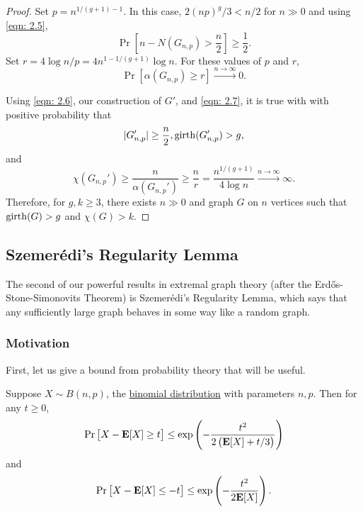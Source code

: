 \documentclass{article}
\begin{document}
\begin{proof}
				Set $p = n^{1/(g+1) - 1}$. In this case, $2(np)^g/3 < n/2$ for $n\gg 0$ and using \eqref{eqn: 2.5},
				\begin{equation}
					\label{eqn: 2.6}
					\Pr\left[ n - N(G_{n,p}) > \frac{n}{2} \right] \ge \frac{1}{2}.
				\end{equation}
				Set $r = 4 \log n / p = 4 n^{1 - 1/(g+1)} \log n$. For these values of $p$ and $r$,
				\begin{equation}
					\label{eqn: 2.7}
					\Pr\left[\alpha(G_{n,p}) \ge r\right] \xrightarrow{n\to\infty} 0.
				\end{equation}

				Using \eqref{eqn: 2.6}, our construction of $G'$, and \eqref{eqn: 2.7}, it is true with with positive probability that
				\[ |G_{n,p}'| \ge \frac{n}{2}, \operatorname{girth}(G_{n,p}') > g, \]
				and
				\[ \chi(G_{n,p}') \ge \frac{n}{\alpha(G_{n,p}')} \ge \frac{n}{r} = \frac{n^{1/(g+1)}}{4\log n} \xrightarrow{n\to\infty} \infty. \]
				Therefore, for $g,k \ge 3$, there exists $n\gg 0$ and graph $G$ on $n$ vertices such that $\operatorname{girth}(G) > g$ and $\chi(G) > k$. 
			\end{proof}

	\subsection{Szemer\'{e}di's Regularity Lemma}

		The second of our powerful results in extremal graph theory (after the Erd\H{o}s-Stone-Simonovits Theorem) is Szemer\'{e}di's Regularity Lemma, which says that any sufficiently large graph behaves in some way like a random graph.

		\subsubsection{Motivation}

			First, let us give a bound from probability theory that will be useful.

			\begin{flem}
				\label{chernoff bound}
				Suppose $X \sim B(n,p)$, the \href{https://en.wikipedia.org/wiki/Binomial_distribution}{binomial distribution} with parameters $n,p$. Then for any $t \ge 0$,
				\[ \Pr\left[ X - \textbf{E}[X] \ge t \right] \le \exp\left(-\frac{t^2}{2\left(\textbf{E}[X] + t/3\right)}\right) \]
				and
				\[ \Pr\left[ X - \textbf{E}[X] \le -t \right] \le \exp\left(-\frac{t^2}{2\textbf{E}[X]}\right). \]
			\end{flem}
\end{document}
